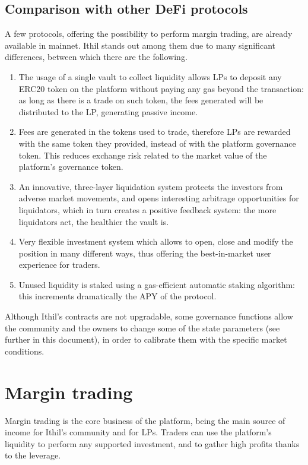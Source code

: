 \documentclass [10pt, fancyhdr, twoside] {article}
\begin{document}
\subsection{Comparison with other DeFi protocols}
A few protocols, offering the possibility to perform margin trading, are already available in mainnet. Ithil stands out among them due to many significant differences, between which there are the following.
\begin{enumerate}
\item The usage of a single vault to collect liquidity allows LPs to deposit any ERC20 token on the platform without paying any gas beyond the transaction: as long as there is a trade on such token, the fees generated will be distributed to the LP, generating passive income.
\item Fees are generated in the tokens used to trade, therefore LPs are rewarded with the same token they provided, instead of with the platform governance token. This reduces exchange risk related to the market value of the platform's governance token.
\item An innovative, three-layer liquidation system protects the investors from adverse market movements, and opens interesting arbitrage opportunities for liquidators, which in turn creates a positive feedback system: the more liquidators act, the healthier the vault is.
\item Very flexible investment system which allows to open, close and modify the position in many different ways, thus offering the best-in-market user experience for traders.
\item Unused liquidity is staked using a gas-efficient automatic staking algorithm: this increments dramatically the APY of the protocol.
\end{enumerate}

Although Ithil's contracts are not upgradable, some governance functions allow the community and the owners to change some of the state parameters (see further in this document), in order to calibrate them with the specific market conditions.

\section{Margin trading}

Margin trading is the core business of the platform, being the main source of income for Ithil's community and for LPs. Traders can use the platform's liquidity to perform any supported investment, and to gather high profits thanks to the leverage.
\end{document}
